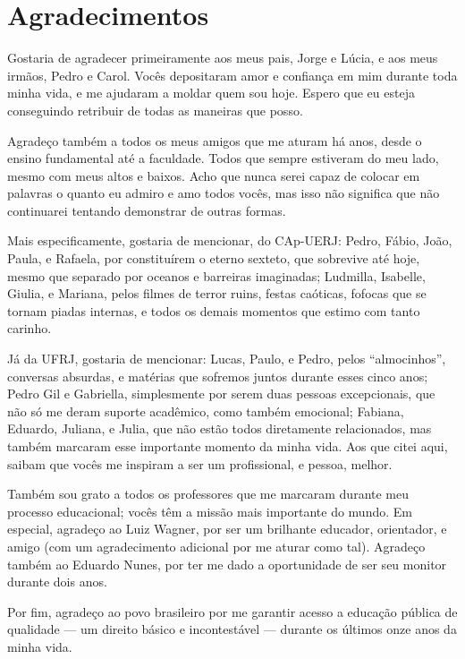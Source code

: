 \chapter*{Agradecimentos}

Gostaria de agradecer primeiramente aos meus pais, Jorge e Lúcia, e aos meus irmãos, Pedro e Carol. Vocês depositaram amor e confiança em mim durante toda minha vida, e me ajudaram a moldar quem sou hoje. Espero que eu esteja conseguindo retribuir de todas as maneiras que posso.

Agradeço também a todos os meus amigos que me aturam há anos, desde o ensino fundamental até a faculdade. Todos que sempre estiveram do meu lado, mesmo com meus altos e baixos. Acho que nunca serei capaz de colocar em palavras o quanto eu admiro e amo todos vocês, mas isso não significa que não continuarei tentando demonstrar de outras formas.

Mais especificamente, gostaria de mencionar, do CAp-UERJ: Pedro, Fábio, João, Paula, e Rafaela, por constituírem o eterno sexteto, que sobrevive até hoje, mesmo que separado por oceanos e barreiras imaginadas; Ludmilla, Isabelle, Giulia, e Mariana, pelos filmes de terror ruins, festas caóticas, fofocas que se tornam piadas internas, e todos os demais momentos que estimo com tanto carinho.

Já da UFRJ, gostaria de mencionar: Lucas, Paulo, e Pedro, pelos ``almocinhos'', conversas absurdas, e matérias que sofremos juntos durante esses cinco anos; Pedro Gil e Gabriella, simplesmente por serem duas pessoas excepcionais, que não só me deram suporte acadêmico, como também emocional; Fabiana, Eduardo, Juliana, e Julia, que não estão todos diretamente relacionados, mas também marcaram esse importante momento da minha vida. Aos que citei aqui, saibam que vocês me inspiram a ser um profissional, e pessoa, melhor.

Também sou grato a todos os professores que me marcaram durante meu processo educacional; vocês têm a missão mais importante do mundo. Em especial, agradeço ao Luiz Wagner, por ser um brilhante educador, orientador, e amigo (com um agradecimento adicional por me aturar como tal). Agradeço também ao Eduardo Nunes, por ter me dado a oportunidade de ser seu monitor durante dois anos.

Por fim, agradeço ao povo brasileiro por me garantir acesso a educação pública de qualidade --- um direito básico e incontestável --- durante os últimos onze anos da minha vida.